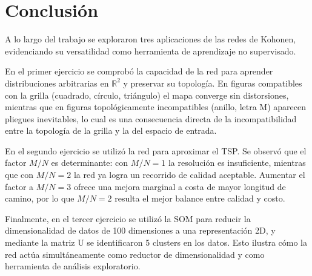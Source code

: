 \section{Conclusión}

A lo largo del trabajo se exploraron tres aplicaciones de las redes de Kohonen, evidenciando su versatilidad como herramienta de aprendizaje no supervisado.

En el primer ejercicio se comprobó la capacidad de la red para aprender distribuciones arbitrarias en $\mathbb{R}^2$ y preservar su topología. En figuras compatibles con la grilla (cuadrado, círculo, triángulo) el mapa converge sin distorsiones, mientras que en figuras topológicamente incompatibles (anillo, letra M) aparecen pliegues inevitables, lo cual es una consecuencia directa de la incompatibilidad entre la topología de la grilla y la del espacio de entrada.

En el segundo ejercicio se utilizó la red para aproximar el TSP. Se observó que el factor $M/N$ es determinante: con $M/N = 1$ la resolución es insuficiente, mientras que con $M/N = 2$ la red ya logra un recorrido de calidad aceptable. Aumentar el factor a $M/N = 3$ ofrece una mejora marginal a costa de mayor longitud de camino, por lo que $M/N = 2$ resulta el mejor balance entre calidad y costo.

Finalmente, en el tercer ejercicio se utilizó la SOM para reducir la dimensionalidad de datos de 100 dimensiones a una representación 2D, y mediante la matriz U se identificaron 5 clusters en los datos. Esto ilustra cómo la red actúa simultáneamente como reductor de dimensionalidad y como herramienta de análisis exploratorio.